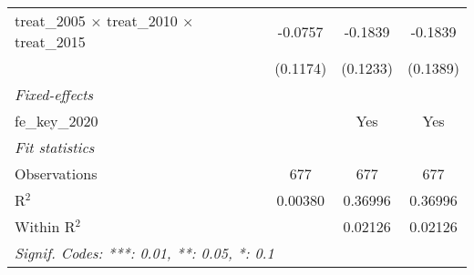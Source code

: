 \begin{table}[htbp]
\begin{tabular}{lccc}
      treat\_2005 $\times$ treat\_2010 $\times$ treat\_2015      & -0.0757        & -0.1839         & -0.1839\\   
                                                                 & (0.1174)       & (0.1233)        & (0.1389)\\   
      \midrule
      \emph{Fixed-effects}\\
      fe\_key\_2020                                              &                & Yes             & Yes\\  
      \midrule
      \emph{Fit statistics}\\
      Observations                                               & 677            & 677             & 677\\  
      R$^2$                                                      & 0.00380        & 0.36996         & 0.36996\\  
      Within R$^2$                                               &                & 0.02126         & 0.02126\\  
      \midrule \midrule
      \multicolumn{4}{l}{\emph{Signif. Codes: ***: 0.01, **: 0.05, *: 0.1}}\\
   \end{tabular}
\end{table}


